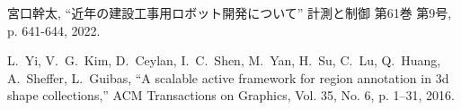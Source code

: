 \begin{thebibliography}{99}

    宮口幹太, “近年の建設工事用ロボット開発について” 計測と制御 第61巻 第9号, p. 641-644, 2022.
    
    L.~Yi, V.~G.~Kim, D.~Ceylan, I.~C.~Shen, M.~Yan, H.~Su, C.~Lu,
    Q.~Huang, A.~Sheffer, L.~Guibas, “A scalable active framework for region annotation in 3d shape collections,” ACM Transactions on Graphics, Vol. 35, No. 6, p. 1–31, 2016.

\end{thebibliography}